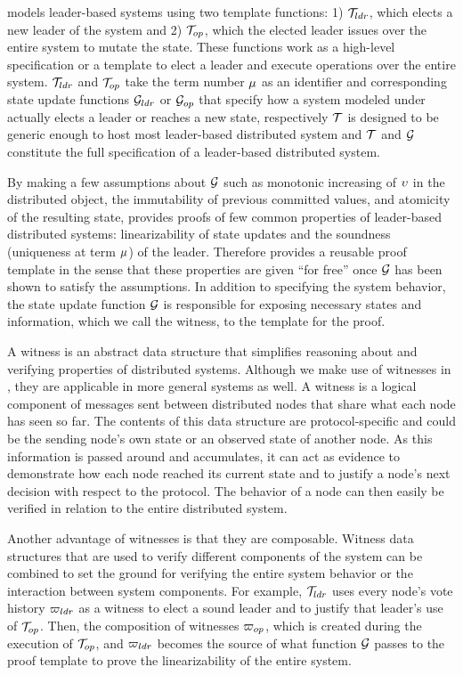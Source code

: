 \sysname{} models leader-based systems using two template functions:
1) $\mathcal{T}_{ldr}$, which elects a new leader of the system and
2) $\mathcal{T}_{op}$, which the elected leader issues over the entire system
to mutate the state. These functions work as a high-level specification or a
template to elect a leader and execute operations over the entire system.
$\mathcal{T}_{ldr}$ and $\mathcal{T}_{op}$ take the term number $\mu$ as an identifier
and corresponding state update functions $\mathcal{G}_{ldr}$ or
$\mathcal{G}_{op}$ that specify how a system modeled under \sysname{}
actually elects a leader or reaches a new state, respectively 
$\mathcal{T}$ is designed to be generic enough to host most
leader-based distributed system and $\mathcal{T}$ and $\mathcal{G}$
constitute the full specification of a leader-based distributed system.


By making a few assumptions  about $\mathcal{G}$
such as monotonic increasing of $\upsilon$ in the distributed object,
the immutability of previous committed values, and atomicity of the resulting
state, \sysname{} provides proofs of few common properties of leader-based distributed systems:
linearizability of state updates and the soundness (uniqueness at term $\mu$)
of the leader.
Therefore \sysname{} provides a reusable proof template in the sense that these properties
are given ``for free'' once $\mathcal{G}$ has been shown to satisfy the assumptions.
In addition to specifying the system behavior,
the state update function $\mathcal{G}$ is responsible for exposing necessary
states and information, which we call the witness, to the template for the proof.

A witness is an abstract data structure that simplifies reasoning about and
verifying properties of distributed systems. Although we make use of witnesses
in \sysname{}, they are applicable in more general systems as well. A witness is
a logical component of messages sent between distributed nodes that share what
each node has seen so far. The contents of this data structure are
protocol-specific and could be the sending node's own state or an observed state
of another node. As this information is passed around and accumulates, it can
act as evidence to demonstrate how each node reached its current state and to
justify a node's next decision with respect to the protocol. The behavior of a
node can then easily be verified in relation to the entire distributed system.

Another advantage of witnesses is that they are composable. Witness data
structures that are used to verify different components of the system can be
combined to set the ground for verifying the entire system behavior or the
interaction between system components. For example, $\mathcal{T}_{ldr}$ uses every
node's vote history ${\varpi_{ldr}}$ as a witness to elect a sound leader and to
justify that leader's use of $\mathcal{T}_{op}$. Then, the composition of witnesses
${\varpi_{op}}$, which is created during the execution of $\mathcal{T}_{op}$, and
${\varpi_{ldr}}$ becomes the source of what function $\mathcal{G}$ passes to
the proof template to prove the linearizability of the entire system.



